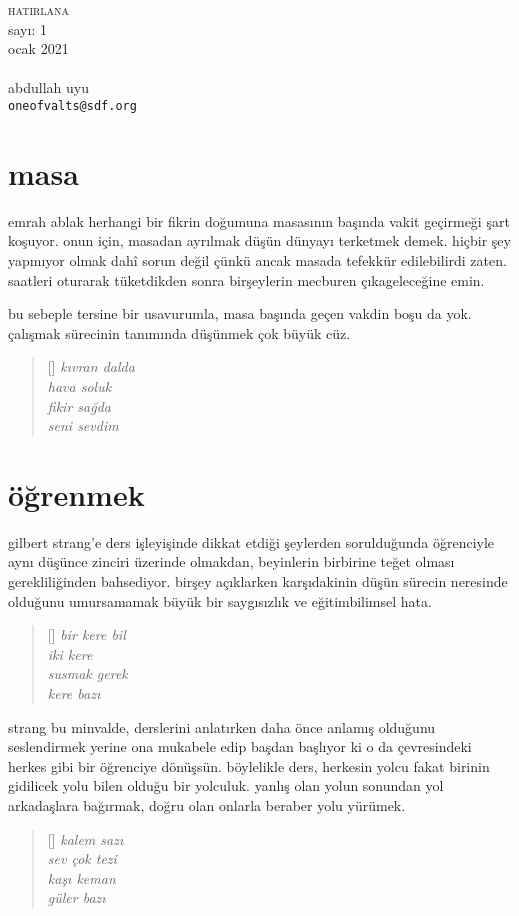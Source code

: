 \documentclass[a4paper, twocolumn, openright]{memoir}
\begin{document}
\thispagestyle{plain}
\noindent
{\HUGE\textsc{hatirlana}\\\small{}sayı: 1\\ocak 2021}\\\\
{\small{}abdullah uyu\\\texttt{oneofvalts@sdf.org}}
\bigskip
\section{masa}
emrah ablak herhangi bir fikrin doğumuna masasının başında vakit
geçirmeği şart koşuyor. onun için, masadan ayrılmak düşün dünyayı
terketmek demek. hiçbir şey yapmıyor olmak dahî sorun değil çünkü ancak
masada tefekkür edilebilirdi zaten. saatleri oturarak tüketdikden sonra
birşeylerin mecburen çıkageleceğine emin.

bu sebeple tersine bir usavurumla, masa başında geçen vakdin boşu da yok.
çalışmak sürecinin tanımında düşünmek çok büyük cüz.
\begin{verse}[\versewidth]
  \itshape{}
  kıvran dalda\\
  hava soluk\\
  fikir sağda\\
  seni sevdim
\end{verse}
\section{öğrenmek}
gilbert strang'e ders işleyişinde dikkat etdiği şeylerden sorulduğunda
öğrenciyle aynı düşünce zinciri üzerinde olmakdan, beyinlerin birbirine
teğet olması gerekliliğinden bahsediyor. birşey açıklarken karşıdakinin
düşün sürecin neresinde olduğunu umursamamak büyük bir saygısızlık ve
eğitimbilimsel hata.
\begin{verse}[\versewidth]
  \itshape{}
  bir kere bil\\
  iki kere\\
  susmak gerek\\
  kere bazı
\end{verse}
strang bu minvalde, derslerini anlatırken daha önce anlamış
olduğunu seslendirmek yerine ona mukabele edip başdan başlıyor ki o da
çevresindeki herkes gibi bir öğrenciye dönüşsün. böylelikle ders,
herkesin yolcu fakat birinin gidilicek yolu bilen olduğu bir yolculuk.
yanlış olan yolun sonundan yol arkadaşlara bağırmak, doğru olan onlarla
beraber yolu yürümek.
\begin{verse}[\versewidth]
  \itshape{}
  kalem sazı\\
  sev çok tezi\\
  kaşı keman\\
  güler bazı
\end{verse}
\end{document}
